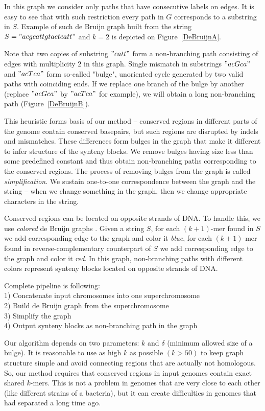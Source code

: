 \documentclass[a4paper,12pt]{scrartcl}
\begin{document}
In this graph we consider only paths that have consecutive labels on edges. It is easy to see that with such restriction every path in \(G\)
corresponds to a substring in \(S\). Example of such de Bruijn graph built from the string \(S = "acgcattgtactcatt" \) and \(k = 2\) is
depicted on Figure~\ref{DeBruijnA}.

Note that two copies of substring \("catt"\) form a non-branching path consisting of edges with multiplicity \(2\) in this graph. Single
mismatch in substrings \("acGca"\) and \("acTca"\) form so-called "bulge", unoriented cycle generated by two valid paths with
coinciding ends. If we replace one branch of the bulge by another (replace \("acGca"\) by \("acTca"\) for example), we will obtain
a long non-branching path (Figure~\ref{DeBruijnB}).

This heuristic forms basis of our method -- conserved regions in different parts of the genome contain conserved basepairs, but
such regions are disrupted by indels and mismatches. These differences form bulges in the graph that make it different to infer
structure of the synteny blocks. We remove bulges having size less than some predefined constant and thus obtain non-branching
paths corresponding to the conserved regions. The process of removing bulges from the graph is called \textit{simplification}. We
sustain one-to-one correspondence between the graph and the string -- when we change something in the graph, then we change
appropriate characters in the string.

Conserved regions can be located on opposite strands of DNA. To handle this, we use \textit{colored} de Bruijn graphs \cite{Iqbal2012}.
Given a string \(S\), for each \((k + 1)\)-mer found in \(S\) we add corresponding edge to the graph and color it \textit{blue}, for 
each \((k + 1)\)-mer found in reverse-complementary counterpart of \(S\) we add corresponding edge to the graph and color it \textit{red}.
In this graph, non-branching paths with different colors represent synteny blocks located on opposite strands of DNA.

Complete pipeline is following:\\
1) Concatenate input chromosomes into one superchromosome \\
2) Build de Bruijn graph from the superchromosome \\
3) Simplify the graph \\
4) Output synteny blocks as non-branching path in the graph 

Our algorithm depends on two parameters: \(k\) and \(\delta\) (minimum allowed size of a bulge). It is reasonable to use as high \(k\) as possible
\((k > 50)\) to keep graph structure simple and avoid connecting regions that are actually not homologous. So, our method requires that conserved regions
in input genomes contain exact shared \(k\)-mers. This is not a problem in genomes that are very close to each other (like different strains of a bacteria),
but it can create difficulties in genomes that had separated a long time ago.
\end{document}
